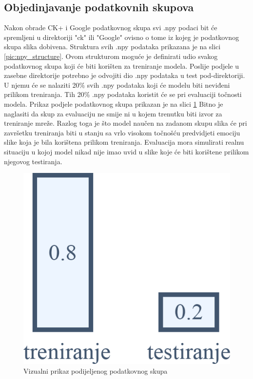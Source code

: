\documentclass[times, utf8, zavrsni,numeric,pstricks]{fer}
\begin{document}
\subsection{Objedinjavanje podatkovnih skupova}
Nakon obrade CK+ i Google podatkovnog skupa svi .npy podaci bit će spremljeni u direktoriji "ck" ili "Google" ovisno o tome iz kojeg je podatkovnog skupa slika dobivena. Struktura svih .npy podataka prikazana je na slici \ref{pic:npy_structure}. Ovom strukturom moguće je definirati udio svakog podatkovnog skupa koji će biti korišten za treniranje modela. Poslije podjele u zasebne direktorije potrebno je odvojiti dio .npy podataka u test pod-direktoriji. U njemu će se nalaziti 20\% svih .npy podataka koji će modelu biti neviđeni prilikom treniranja. Tih 20\% .npy podataka koristit će se pri evaluaciji točnosti modela. Prikaz podjele podatkovnog skupa prikazan je na slici \ref{pic:dataset_split_percentages} Bitno je naglasiti da skup za evaluaciju ne smije ni u kojem trenutku biti izvor za treniranje mreže. Razlog toga je što model naučen na zadanom skupu slika će pri završetku treniranja biti u stanju sa vrlo visokom točnošću predvidjeti emociju slike koja je bila korištena prilikom treniranja. Evaluacija mora simulirati realnu situaciju u kojoj model nikad nije imao uvid u slike koje će biti korištene prilikom njegovog testiranja.

\begin{figure}[H]
	\centering
	\includegraphics[width=\linewidth, height=0.3\paperheight, keepaspectratio]{splitset.png}
	\caption{Vizualni prikaz podijeljenog podatkovnog skupa}
	\label{pic:dataset_split_percentages}
\end{figure}
\end{document}
